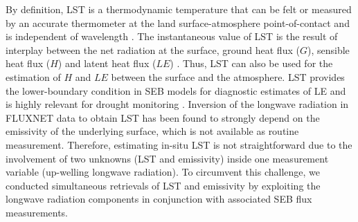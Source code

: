 \documentclass[fleqn,10pt]{wlscirep}
\begin{document}
 By definition, LST is a thermodynamic temperature that can be felt or measured by an accurate thermometer at the land surface-atmosphere point-of-contact and is independent of wavelength \cite{guillevic2017land}. The instantaneous value of LST is the result of interplay between the net radiation at the surface, ground heat flux ($G$), sensible heat flux ($H$) and latent heat flux ($LE$) \cite{wang2013global}. Thus, LST can also be used for the estimation of $H$ \cite{sun1995relationship} and $LE$ \cite{jacob2001comprehensive} between the surface and the atmosphere. LST provides the lower-boundary condition in SEB models for diagnostic estimates of LE  and is highly relevant for drought monitoring \cite{trebs2021role,mallick2016canopy,mallick2015reintroducing}. 
  Inversion of the longwave radiation in FLUXNET data to obtain LST has been found to strongly depend on the emissivity of the underlying surface\cite{mallick2018bridging}, which is not available as routine measurement. Therefore, estimating in-situ LST is not straightforward due to the involvement of two unknowns (LST and emissivity) inside one measurement variable (up-welling longwave radiation). To circumvent this challenge, we conducted simultaneous retrievals of LST and emissivity by exploiting the longwave radiation components in conjunction with associated SEB flux measurements.
\end{document}
